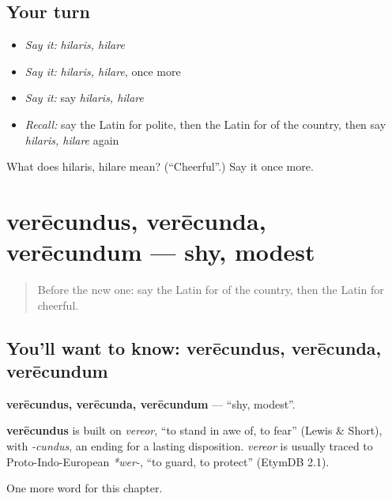 \subsection*{Your turn}
\begin{itemize}
\raggedright
  \item \emph{Say it:} \emph{hilaris, hilare}
  \item \emph{Say it:} \emph{hilaris, hilare}, once more
  \item \emph{Say it:} say \emph{hilaris, hilare}
  \item \emph{Recall:} say the Latin for polite, then the Latin for of the country, then say \emph{hilaris, hilare} again
\end{itemize}

\begin{tcolorbox}[breakable,colback=teal!4,colframe=teal!35!black,title={Before you move on}]
What does hilaris, hilare mean? (\textquotedblleft{}Cheerful\textquotedblright{}.) Say it once more.
\end{tcolorbox}
\section[verēcundus, verēcunda, verēcundum]{verēcundus, verēcunda, verēcundum — shy, modest}

\label{lesson:LA-C180-verecundus}



\begin{quote}
Before the new one: say the Latin for of the country, then the Latin for cheerful.
\end{quote}

\subsection*{You'll want to know: verēcundus, verēcunda, verēcundum}
\textbf{verēcundus, verēcunda, verēcundum} — \textquotedblleft{}shy, modest\textquotedblright{}.

\begin{cousinweb}
\textbf{verēcundus} is built on \emph{vereor}, \textquotedblleft{}to stand in awe of, to fear\textquotedblright{} (Lewis \& Short), with \emph{-cundus}, an ending for a lasting disposition. \emph{vereor} is usually traced to Proto-Indo-European \emph{*wer-}, \textquotedblleft{}to guard, to protect\textquotedblright{} (EtymDB 2.1).
\end{cousinweb}

\begin{grammarlens}[title={What you've built}]
One more word for this chapter.
\end{grammarlens}

